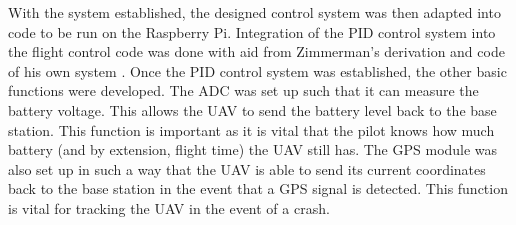\documentclass[english]{upeeei}
\begin{document}
With the system established, the designed control system was then adapted into code to be run on the Raspberry Pi. 
Integration of the PID control system into the flight control code was done with aid from Zimmerman's 
derivation and code of his own system \cite{zimmerman2016}. Once the PID control system was established, the other basic 
functions were developed. The ADC was set up such that it can measure the battery voltage. This allows the UAV to
send the battery level back to the base station. This function is important as it is vital that the pilot knows how much battery
(and by extension, flight time) the UAV still has. The GPS module was also set up in such a way that the UAV is able to
send its current coordinates back to the base station in the event that a GPS signal is detected. This function is vital for
tracking the UAV in the event of a crash.
\end{document}
